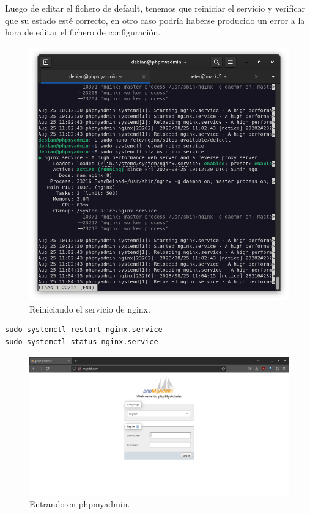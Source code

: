 Luego de editar el fichero de default, tenemos que reiniciar el servicio y verificar que su estado esté correcto, en otro caso podría haberse producido un error a la hora de editar el fichero de configuración.

\begin{figure}[H]
	\centering
	\includegraphics[scale=0.30]{10}
	\caption{Reiniciando el servicio de nginx.}
\end{figure}

\begin{lstlisting}[style=mybash]
sudo systemctl restart nginx.service
sudo systemctl status nginx.service
\end{lstlisting}

\begin{figure}[H]
	\centering
	\includegraphics[scale=0.30]{08}
	\caption{Entrando en phpmyadmin.}
\end{figure}


